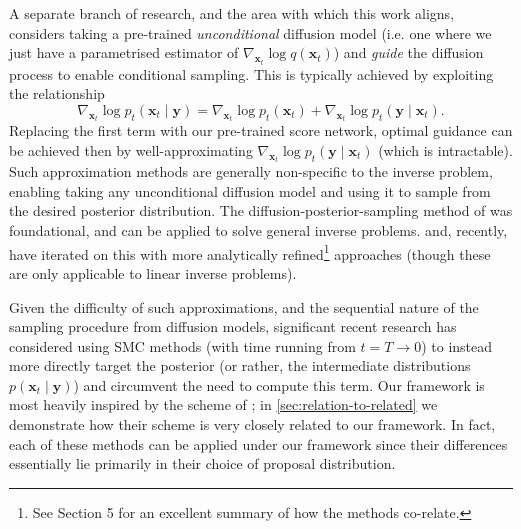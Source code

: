 A separate branch of research, and the area with which this work aligns, considers taking a pre-trained
\emph{unconditional} diffusion model (i.e. one where we just have a parametrised estimator of
$\nabla_{\mathbf{x}_t}\log q(\mathbf{x}_t)$) and \emph{guide} the diffusion process to enable
conditional sampling. This is typically achieved by exploiting the relationship
\begin{equation}
    \nabla_{\mathbf{x}_t} \log p_t(\mathbf{x}_t \mid \mathbf{y}) = \nabla_{\mathbf{x}_t} \log p_t(\mathbf{x}_t) + \nabla_{\mathbf{x}_t}\log p_t(\mathbf{y} \mid \mathbf{x}_t). \label{eq:cond-score}
\end{equation}
Replacing the first term with our pre-trained score network, optimal guidance can be achieved then
by well-approximating $\nabla_{\mathbf{x}_t}\log p_t(\mathbf{y} \mid \mathbf{x}_t)$ (which is
intractable). Such approximation methods are generally non-specific to the inverse problem, enabling
taking any unconditional diffusion model and using it to sample from the desired posterior
distribution. The diffusion-posterior-sampling method of
\textcite{chungDiffusionPosteriorSampling2022} was foundational, and can be applied to solve general
inverse problems. \textcite{song2023pseudoinverseguided} and, recently,
\textcite{boysTweedieMomentProjected2023} have iterated on this with more analytically
refined\footnote{See \cite{boysTweedieMomentProjected2023} Section 5 for an excellent summary
of how the methods co-relate.}
approaches (though these are only applicable to linear inverse problems).

Given the difficulty of such approximations, and the sequential nature of the sampling procedure
from diffusion models, significant recent research
\parencite{cardosoMonteCarloGuided2023,trippeDiffusionProbabilisticModeling2023,
wuPracticalAsymptoticallyExact2023,douDiffusionPosteriorSampling2023,
janatiDivideandConquerPosteriorSampling2024} has considered using SMC methods (with time running
from $t=T \to 0$) to instead more directly target the posterior (or rather, the intermediate
distributions $p(\mathbf{x}_t \mid \mathbf{y})$) and circumvent the need to compute this term. Our
framework is most heavily inspired by the scheme of \textcite{cardosoMonteCarloGuided2023}; in
\autoref{sec:relation-to-related} we demonstrate how their scheme is very closely related to our
framework. In fact, each of these methods can be applied under our framework since their differences
essentially lie primarily in their choice of proposal distribution.

